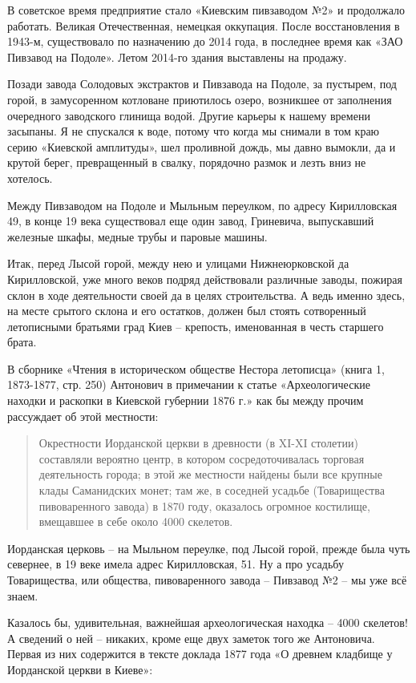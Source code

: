 В советское время предприятие стало «Киевским пивзаводом №2» и продолжало работать. Великая Отечественная, немецкая оккупация. После восстановления в 1943-м, существовало по назначению до 2014 года, в последнее время как «ЗАО Пивзавод на Подоле». Летом 2014-го здания выставлены на продажу.

Позади завода Солодовых экстрактов и Пивзавода на Подоле, за пустырем, под горой, в замусоренном котловане приютилось озеро, возникшее от заполнения очередного заводского глинища водой. Другие карьеры к нашему времени засыпаны. Я не спускался к воде, потому что когда мы снимали в том краю серию «Киевской амплитуды», шел проливной дождь, мы давно вымокли, да и крутой берег, превращенный в свалку, порядочно размок и лезть вниз не хотелось.

Между Пивзаводом на Подоле и Мыльным переулком, по адресу Кирилловская 49, в конце 19 века существовал еще один завод, Гриневича, выпускавший железные шкафы, медные трубы и паровые машины.

Итак, перед Лысой горой, между нею и улицами Нижнеюрковской да Кирилловской, уже много веков подряд действовали различные заводы, пожирая склон в ходе деятельности своей да в целях строительства. А ведь именно здесь, на месте срытого склона и его остатков, должен был стоять сотворенный летописными братьями град Киев – крепость, именованная в честь старшего брата. 

В сборнике «Чтения в историческом обществе Нестора летописца» (книга 1, 1873-1877, стр. 250) Антонович в примечании к статье «Археологические находки и раскопки в Киевской губернии 1876 г.» как бы между прочим рассуждает об этой местности:

\begin{quotation}
Окрестности Иорданской церкви в древности (в XI-XI столетии) составляли вероятно центр, в котором сосредоточивалась торговая деятельность города; в этой же местности найдены были все крупные клады Саманидских монет; там же, в соседней усадьбе (Товарищества пивоваренного завода) в 1870 году, оказалось огромное костилище, вмещавшее в себе около 4000 скелетов.
\end{quotation}

Иорданская церковь – на Мыльном переулке, под Лысой горой, прежде была чуть севернее, в 19 веке имела адрес Кирилловская, 51. Ну а про усадьбу Товарищества, или общества, пивоваренного завода – Пивзавод №2 – мы уже всё знаем.

Казалось бы, удивительная, важнейшая археологическая находка – 4000 скелетов! А сведений о ней – никаких, кроме еще двух заметок того же Антоновича. Первая из них содержится в тексте доклада 1877 года «О древнем кладбище у Иорданской церкви в Киеве»:

